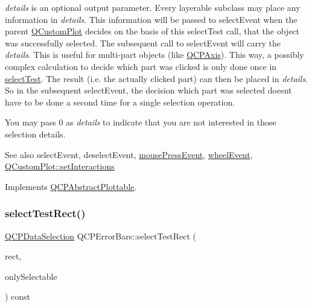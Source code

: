 {\itshape details} is an optional output parameter. Every layerable subclass may place any information in {\itshape details}. This information will be passed to select\+Event when the parent \hyperlink{class_q_custom_plot}{Q\+Custom\+Plot} decides on the basis of this select\+Test call, that the object was successfully selected. The subsequent call to select\+Event will carry the {\itshape details}. This is useful for multi-\/part objects (like \hyperlink{class_q_c_p_axis}{Q\+C\+P\+Axis}). This way, a possibly complex calculation to decide which part was clicked is only done once in \hyperlink{class_q_c_p_error_bars_ac1b6675ef43e32547a3cbcf7b7ac46ed}{select\+Test}. The result (i.\+e. the actually clicked part) can then be placed in {\itshape details}. So in the subsequent select\+Event, the decision which part was selected doesn\textquotesingle{}t have to be done a second time for a single selection operation.

You may pass 0 as {\itshape details} to indicate that you are not interested in those selection details.

\begin{DoxySeeAlso}{See also}
select\+Event, deselect\+Event, \hyperlink{class_q_c_p_layerable_af6567604818db90f4fd52822f8bc8376}{mouse\+Press\+Event}, \hyperlink{class_q_c_p_layerable_a47dfd7b8fd99c08ca54e09c362b6f022}{wheel\+Event}, \hyperlink{class_q_custom_plot_a5ee1e2f6ae27419deca53e75907c27e5}{Q\+Custom\+Plot\+::set\+Interactions} 
\end{DoxySeeAlso}


Implements \hyperlink{class_q_c_p_abstract_plottable_a38efe9641d972992a3d44204bc80ec1d}{Q\+C\+P\+Abstract\+Plottable}.

\mbox{\label{class_q_c_p_error_bars_ac32f9e729cb205ca56821f9b663472c0}} 
\subsubsection{\texorpdfstring{select\+Test\+Rect()}{selectTestRect()}}
{\footnotesize\ttfamily \hyperlink{class_q_c_p_data_selection}{Q\+C\+P\+Data\+Selection} Q\+C\+P\+Error\+Bars\+::select\+Test\+Rect (\begin{DoxyParamCaption}\item[{const Q\+RectF \&}]{rect,  }\item[{bool}]{only\+Selectable }\end{DoxyParamCaption}) const\hspace{0.3cm}{\ttfamily [virtual]}}





